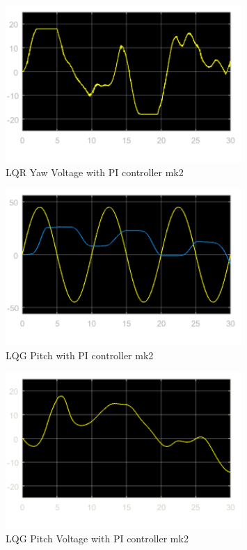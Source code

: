 \documentclass[fontsize=11pt, %
                             paper=letter, %
                             openany, %
                             captions=tableheading,
                             index=totoc,
                             hyperref]{labbook}
\begin{document}
\begin{addmargin}[0cm]{0cm}
\begin{figure}[H]
  \centering
  \includegraphics[width=0.8\textwidth]{figs/img/02192019/LQRYawVoltmk2.png}
  \caption{LQR Yaw Voltage with PI controller mk2}
  \label{fig:LQR_PI_YawVoltmk2}
\end{figure}

\begin{figure}[H]
  \centering
  \includegraphics[width=0.8\textwidth]{figs/img/02192019/LQGPitchmk2.png}
  \caption{LQG Pitch with PI controller mk2}
  \label{fig:LQG_PI_Pitchmk2}
\end{figure}

\begin{figure}[H]
  \centering
  \includegraphics[width=0.8\textwidth]{figs/img/02192019/LQGPitchVoltmk2.png}
  \caption{LQG Pitch Voltage with PI controller mk2}
  \label{fig:LQG_PI_PitchVoltmk2}
\end{figure}


\end{addmargin}
\end{document}
